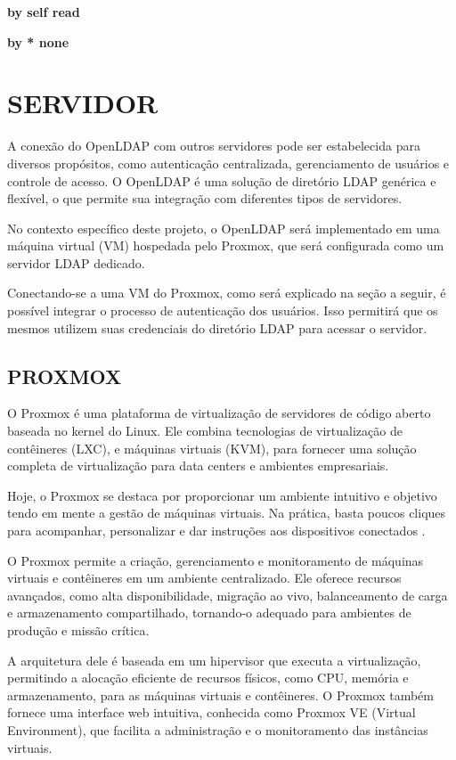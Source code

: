 \textbf{by self read}

\textbf{by * none}

\section{SERVIDOR}

A conexão do OpenLDAP com outros servidores pode ser estabelecida para diversos propósitos, como autenticação centralizada, gerenciamento de usuários e controle de acesso. O OpenLDAP é uma solução de diretório LDAP genérica e flexível, o que permite sua integração com diferentes tipos de servidores.

No contexto específico deste projeto, o OpenLDAP será implementado em uma máquina virtual (VM) hospedada pelo Proxmox, que será configurada como um servidor LDAP dedicado.

Conectando-se a uma VM do Proxmox, como será explicado na seção a seguir, é possível integrar o processo de autenticação dos usuários. Isso permitirá que os mesmos utilizem suas credenciais do diretório LDAP para acessar o servidor.

\subsection{PROXMOX}

O Proxmox é uma plataforma de virtualização de servidores de código aberto baseada no kernel do Linux. Ele combina tecnologias de virtualização de contêineres (LXC), e máquinas virtuais (KVM), para fornecer uma solução completa de virtualização para data centers e ambientes empresariais.

Hoje, o Proxmox se destaca por proporcionar um ambiente intuitivo e objetivo tendo em mente a gestão de máquinas virtuais. Na prática, basta poucos cliques para acompanhar, personalizar e dar instruções aos dispositivos conectados \cite{oliveira2022vantagens}.

O Proxmox permite a criação, gerenciamento e monitoramento de máquinas virtuais e contêineres em um ambiente centralizado. Ele oferece recursos avançados, como alta disponibilidade, migração ao vivo, balanceamento de carga e armazenamento compartilhado, tornando-o adequado para ambientes de produção e missão crítica.

A arquitetura dele é baseada em um hipervisor que executa a virtualização, permitindo a alocação eficiente de recursos físicos, como CPU, memória e armazenamento, para as máquinas virtuais e contêineres. O Proxmox também fornece uma interface web intuitiva, conhecida como Proxmox VE (Virtual Environment), que facilita a administração e o monitoramento das instâncias virtuais.

